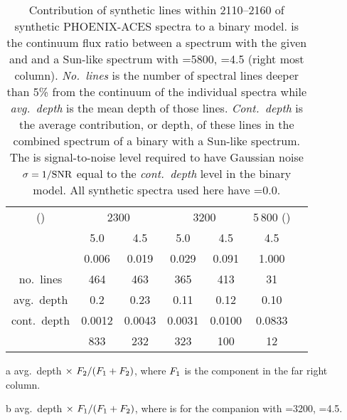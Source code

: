 
\begin{table}
    \centering
    \begin{threeparttable}[b]
        \caption[Analysis of spectral line depths.]{Contribution of synthetic lines within 2110--2160\nm{} of synthetic {PHOENIX-ACES} spectra to a binary model.
            \FtwoFone{} is the continuum flux ratio between a spectrum with the given \Teff{} and \Logg{} and a Sun-like spectrum with \Teff{}=5800, \Logg{}=4.5 (right most column).
            \emph{No.~lines} is the number of spectral lines deeper than 5\% from the continuum of the individual spectra while \emph{avg.~depth} is the mean depth of those lines.
            \emph{Cont.~depth} is the average contribution, or depth, of these lines in the combined spectrum of a binary with a Sun-like spectrum.
            The \snr{} is signal-to-noise level required to have Gaussian noise \(\sigma=1/\textrm{SNR}{}\) equal to the \emph{cont.~depth} level in the binary model.
            All synthetic spectra used here have \feh{}=0.0.}
        \begin{tabular}{*7c}
            \toprule
            \Teff{} (\K{}) & \multicolumn{2}{c}{2300} & \multicolumn{2}{c}{3200} & 5\,800 (\Fone{})\\
           \Logg{} & 5.0 & 4.5 & 5.0 & 4.5 & 4.5 \\
            \midrule
            \FtwoFone{} & 0.006 & 0.019 & 0.029 & 0.091 & 1.000 \\
            no.~lines & 464 & 463 & 365 & 413 & 31 \\
            avg.~depth & 0.2 & 0.23 & 0.11 & 0.12 & 0.10 \\
            cont.~depth\tnote{a} &  0.0012 & 0.0043 &  0.0031 & 0.0100 & 0.0833\tnote{b} \\
            \snr{} & 833 & 232 & 323 & 100 & 12 \\
            \bottomrule
        \end{tabular}\label{tab:line_contributions}
        \begin{tablenotes}
            \item [a] avg.~depth \(\times~ {F}_{2}{} / ({F}_{1}{} + {F}_{2}{})\), where \({F}_{1}{}\) is the component in the far right column.
            \item[b] avg.~depth \(\times~ {F}_{1}{} / ({F}_{1}{} + {F}_{2}{})\), where \Ftwo{} is for the companion with \Teff{}=3200, \Logg{}=4.5.
        \end{tablenotes}
    \end{threeparttable}
\end{table}
